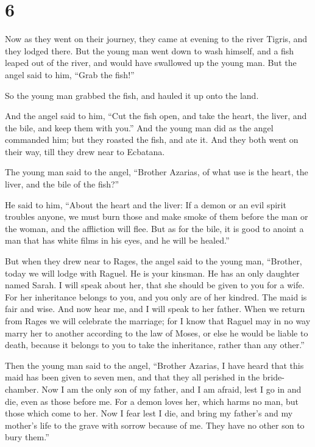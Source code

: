 \hypertarget{section-5}{%
\section{6}\label{section-5}}

 Now as they went on their journey, they came at evening
to the river Tigris, and they lodged there.  But the young
man went down to wash himself, and a fish leaped out of the river, and
would have swallowed up the young man.  But the angel said
to him, ``Grab the fish!''

So the young man grabbed the fish, and hauled it up onto the land.

 And the angel said to him, ``Cut the fish open, and take
the heart, the liver, and the bile, and keep them with you.''
 And the young man did as the angel commanded him; but
they roasted the fish, and ate it. And they both went on their way, till
they drew near to Ecbatana.

 The young man said to the angel, ``Brother Azarias, of
what use is the heart, the liver, and the bile of the fish?''

 He said to him, ``About the heart and the liver: If a
demon or an evil spirit troubles anyone, we must burn those and make
smoke of them before the man or the woman, and the affliction will flee.
 But as for the bile, it is good to anoint a man that has
white films in his eyes, and he will be healed.''

 But when they drew near to Rages,  the
angel said to the young man, ``Brother, today we will lodge with Raguel.
He is your kinsman. He has an only daughter named Sarah. I will speak
about her, that she should be given to you for a wife. 
For her inheritance belongs to you, and you only are of her kindred.
 The maid is fair and wise. And now hear me, and I will
speak to her father. When we return from Rages we will celebrate the
marriage; for I know that Raguel may in no way marry her to another
according to the law of Moses, or else he would be liable to death,
because it belongs to you to take the inheritance, rather than any
other.''

 Then the young man said to the angel, ``Brother Azarias,
I have heard that this maid has been given to seven men, and that they
all perished in the bride-chamber.  Now I am the only son
of my father, and I am afraid, lest I go in and die, even as those
before me. For a demon loves her, which harms no man, but those which
come to her. Now I fear lest I die, and bring my father's and my
mother's life to the grave with sorrow because of me. They have no other
son to bury them.''


